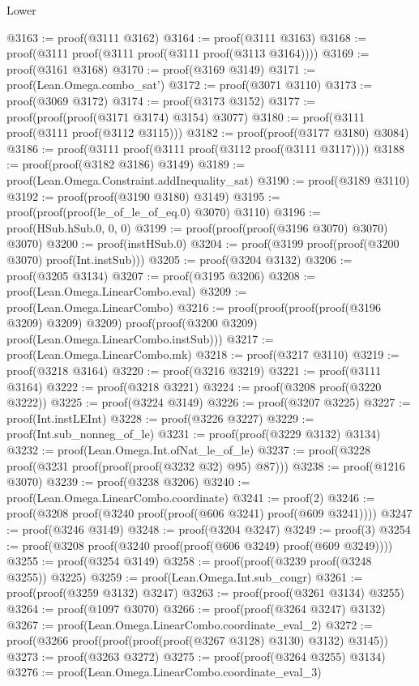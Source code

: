 \begin{lexlean}{Lower}
\begin{coremodule}
@3163 := proof(@3111 @3162)
@3164 := proof(@3111 @3163)
@3168 := proof(@3111 proof(@3111 proof(@3111 proof(@3113 @3164))))
@3169 := proof(@3161 @3168)
@3170 := proof(@3169 @3149)
@3171 := proof(Lean.Omega.combo_sat')
@3172 := proof(@3071 @3110)
@3173 := proof(@3069 @3172)
@3174 := proof(@3173 @3152)
@3177 := proof(proof(proof(@3171 @3174) @3154) @3077)
@3180 := proof(@3111 proof(@3111 proof(@3112 @3115)))
@3182 := proof(proof(@3177 @3180) @3084)
@3186 := proof(@3111 proof(@3111 proof(@3112 proof(@3111 @3117))))
@3188 := proof(proof(@3182 @3186) @3149)
@3189 := proof(Lean.Omega.Constraint.addInequality_sat)
@3190 := proof(@3189 @3110)
@3192 := proof(proof(@3190 @3180) @3149)
@3195 := proof(proof(proof(le_of_le_of_eq.{0}) @3070) @3110)
@3196 := proof(HSub.hSub.{0, 0, 0})
@3199 := proof(proof(proof(@3196 @3070) @3070) @3070)
@3200 := proof(instHSub.{0})
@3204 := proof(@3199 proof(proof(@3200 @3070) proof(Int.instSub)))
@3205 := proof(@3204 @3132)
@3206 := proof(@3205 @3134)
@3207 := proof(@3195 @3206)
@3208 := proof(Lean.Omega.LinearCombo.eval)
@3209 := proof(Lean.Omega.LinearCombo)
@3216 := proof(proof(proof(proof(@3196 @3209) @3209) @3209)
      proof(proof(@3200 @3209) proof(Lean.Omega.LinearCombo.instSub)))
@3217 := proof(Lean.Omega.LinearCombo.mk)
@3218 := proof(@3217 @3110)
@3219 := proof(@3218 @3164)
@3220 := proof(@3216 @3219)
@3221 := proof(@3111 @3164)
@3222 := proof(@3218 @3221)
@3224 := proof(@3208 proof(@3220 @3222))
@3225 := proof(@3224 @3149)
@3226 := proof(@3207 @3225)
@3227 := proof(Int.instLEInt)
@3228 := proof(@3226 @3227)
@3229 := proof(Int.sub_nonneg_of_le)
@3231 := proof(proof(@3229 @3132) @3134)
@3232 := proof(Lean.Omega.Int.ofNat_le_of_le)
@3237 := proof(@3228 proof(@3231 proof(proof(proof(@3232 @32) @95) @87)))
@3238 := proof(@1216 @3070)
@3239 := proof(@3238 @3206)
@3240 := proof(Lean.Omega.LinearCombo.coordinate)
@3241 := proof(2)
@3246 := proof(@3208 proof(@3240 proof(proof(@606 @3241) proof(@609 @3241))))
@3247 := proof(@3246 @3149)
@3248 := proof(@3204 @3247)
@3249 := proof(3)
@3254 := proof(@3208 proof(@3240 proof(proof(@606 @3249) proof(@609 @3249))))
@3255 := proof(@3254 @3149)
@3258 := proof(proof(@3239 proof(@3248 @3255)) @3225)
@3259 := proof(Lean.Omega.Int.sub_congr)
@3261 := proof(proof(@3259 @3132) @3247)
@3263 := proof(proof(@3261 @3134) @3255)
@3264 := proof(@1097 @3070)
@3266 := proof(proof(@3264 @3247) @3132)
@3267 := proof(Lean.Omega.LinearCombo.coordinate_eval_2)
@3272 := proof(@3266 proof(proof(proof(proof(@3267 @3128) @3130) @3132) @3145))
@3273 := proof(@3263 @3272)
@3275 := proof(proof(@3264 @3255) @3134)
@3276 := proof(Lean.Omega.LinearCombo.coordinate_eval_3)

\end{coremodule}
\end{lexlean}
